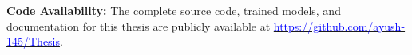 \documentclass[11pt, a4paper, twoside, openany]{book}
\begin{document}
\let\oldbibliography\thebibliography
\renewcommand{\thebibliography}[1]{%
  \oldbibliography{#1}%
  \setlength{\itemsep}{0pt}%
  \setlength{\parskip}{0pt}%
}



\vspace{1cm}
\noindent\textbf{Code Availability:} The complete source code, trained models, and documentation for this thesis are publicly available at \href{https://github.com/ayush-145/Thesis}{\textcolor{blue}{https://github.com/ayush-145/Thesis}}.
\end{document}
